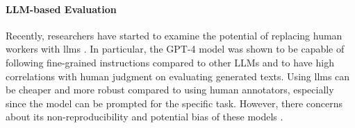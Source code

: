 \paragraph{LLM-based Evaluation} Recently, researchers have started to examine the potential of replacing human workers with \acp{llm} \cite{zhaoInvestigatingTabletoTextGeneration2023,sottanaEvaluationMetricsEra2023,kocmiLargeLanguageModels2023,chiang-lee-2023-large,wangChatGPTGoodNLG2023a,fu2023gptscore}. In particular, the GPT-4 model \cite{openai2023gpt4} was shown to be capable of following fine-grained instructions compared to other LLMs and to have high correlations with human judgment on evaluating generated texts. Using \acp{llm} can be cheaper and more robust compared to using human annotators, especially since the model can be prompted for the specific task. However, there concerns about its non-reproducibility \cite{kocmiGEMBAMQMDetectingTranslation2023} and potential bias of these models \cite{wangLargeLanguageModels2023}.